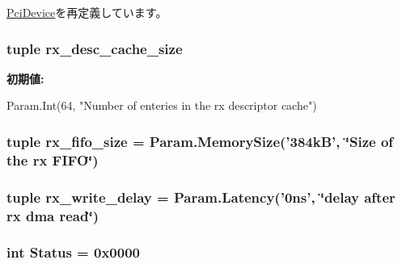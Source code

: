 \hyperlink{classPci_1_1PciDevice_ae1b2d8ef2a839fabf99be35121a8b6e8}{PciDevice}を再定義しています。\hypertarget{classEthernet_1_1IGbE_a0ed725185798e608032b376fe4c05270}{
\subsubsection[{rx\_\-desc\_\-cache\_\-size}]{\setlength{\rightskip}{0pt plus 5cm}tuple {\bf rx\_\-desc\_\-cache\_\-size}}}
\label{classEthernet_1_1IGbE_a0ed725185798e608032b376fe4c05270}
{\bfseries 初期値:}
\begin{DoxyCode}
Param.Int(64,
        "Number of enteries in the rx descriptor cache")
\end{DoxyCode}
\hypertarget{classEthernet_1_1IGbE_a4b48836aef9c8017ad618a4a50417609}{
\subsubsection[{rx\_\-fifo\_\-size}]{\setlength{\rightskip}{0pt plus 5cm}tuple {\bf rx\_\-fifo\_\-size} = Param.MemorySize('384kB', \char`\"{}Size of the rx FIFO\char`\"{})}}
\label{classEthernet_1_1IGbE_a4b48836aef9c8017ad618a4a50417609}
\hypertarget{classEthernet_1_1IGbE_adc456d825e9bf9c810f517523202bec2}{
\subsubsection[{rx\_\-write\_\-delay}]{\setlength{\rightskip}{0pt plus 5cm}tuple {\bf rx\_\-write\_\-delay} = Param.Latency('0ns', \char`\"{}delay after rx dma read\char`\"{})}}
\label{classEthernet_1_1IGbE_adc456d825e9bf9c810f517523202bec2}
\hypertarget{classEthernet_1_1IGbE_ae58c2415cf1178457fa1254234c3f017}{
\subsubsection[{Status}]{\setlength{\rightskip}{0pt plus 5cm}int {\bf Status} = 0x0000}}
\label{classEthernet_1_1IGbE_ae58c2415cf1178457fa1254234c3f017}


